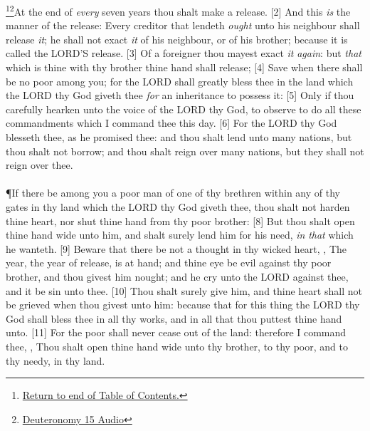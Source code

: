 \footnote{\textcolor[cmyk]{0.99998,1,0,0}{\hyperlink{TOC}{Return to end of Table of Contents.}}}\footnote{\href{https://audiobible.com/bible/deuteronomy_15.html}{\textcolor[cmyk]{0.99998,1,0,0}{Deuteronomy 15 Audio}}}\textcolor[cmyk]{0.99998,1,0,0}{At the end of \emph{every} seven years thou shalt make a release.}
[2] \textcolor[cmyk]{0.99998,1,0,0}{And this \emph{is} the manner of the release: Every creditor that lendeth \emph{ought} unto his neighbour shall release \emph{it}; he shall not exact \emph{it} of his neighbour, or of his brother; because it is called the LORD'S release.}
[3] \textcolor[cmyk]{0.99998,1,0,0}{Of a foreigner thou mayest exact \emph{it} \emph{again}: but \emph{that} which is thine with thy brother thine hand shall release;}
[4] \textcolor[cmyk]{0.99998,1,0,0}{Save when there shall be no poor among you; for the LORD shall greatly bless thee in the land which the LORD thy God giveth thee \emph{for} an inheritance to possess it:}
[5] \textcolor[cmyk]{0.99998,1,0,0}{Only if thou carefully hearken unto the voice of the LORD thy God, to observe to do all these commandments which I command thee this day.}
[6] \textcolor[cmyk]{0.99998,1,0,0}{For the LORD thy God blesseth thee, as he promised thee: and thou shalt lend unto many nations, but thou shalt not borrow; and thou shalt reign over many nations, but they shall not reign over thee.}\\
\\
\P \textcolor[cmyk]{0.99998,1,0,0}{If there be among you a poor man of one of thy brethren within any of thy gates in thy land which the LORD thy God giveth thee, thou shalt not harden thine heart, nor shut thine hand from thy poor brother:}
[8] \textcolor[cmyk]{0.99998,1,0,0}{But thou shalt open thine hand wide unto him, and shalt surely lend him  for his need, \emph{in} \emph{that} which he wanteth.}
[9] \textcolor[cmyk]{0.99998,1,0,0}{Beware that there be not a thought in thy wicked heart, , The  year, the year of release, is at hand; and thine eye be evil against thy poor brother, and thou givest him nought; and he cry unto the LORD against thee, and it be sin unto thee.}
[10] \textcolor[cmyk]{0.99998,1,0,0}{Thou shalt surely give him, and thine heart shall not be grieved when thou givest unto him: because that for this thing the LORD thy God shall bless thee in all thy works, and in all that thou puttest thine hand unto.}
[11] \textcolor[cmyk]{0.99998,1,0,0}{For the poor shall never cease out of the land: therefore I command thee, , Thou shalt open thine hand wide unto thy brother, to thy poor, and to thy needy, in thy land.}\\

